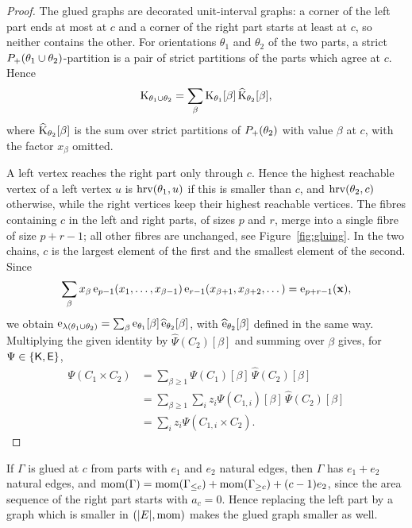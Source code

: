 \begin{proof}
The glued graphs are decorated unit-interval graphs: a corner of the left part
ends at most at $c$ and a corner of the right part starts at least at $c$, so
neither contains the other.
For orientations $\theta_1$ and $\theta_2$ of the two parts, a strict
$P_{+}(\theta_1\cup\theta_2)$-partition is a pair of strict partitions of the
parts which agree at $c$.
Hence
\[
 \mathrm{K}_{\theta_1\cup\theta_2}=\sum_\beta\mathrm{K}_{\theta_1}[\beta]\,
 \widehat{\mathrm{K}}_{\theta_2}[\beta],
\]
where $\widehat{\mathrm{K}}_{\theta_2}[\beta]$ is the sum over strict partitions of
$P_{+}(\theta_2)$ with value $\beta$ at $c$, with the factor $x_\beta$ omitted.

A left vertex reaches the right part only through $c$.
Hence the highest reachable vertex of a left vertex $u$ is
$\operatorname{hrv}(\theta_1,u)$ if this is smaller than $c$, and $\operatorname{hrv}(\theta_2,c)$
otherwise, while the right vertices keep their highest reachable vertices.
The fibres containing $c$ in the left and right parts, of sizes $p$ and $r$,
merge into a single fibre of size $p+r-1$; all other fibres are unchanged, see
Figure~\ref{fig:gluing}.
In the two chains, $c$ is the largest element of the first and the smallest
element of the second.
Since
\[
 \sum_\beta x_\beta\,\mathrm{e}_{p-1}(x_1,\dotsc,x_{\beta-1})\,
 \mathrm{e}_{r-1}(x_{\beta+1},x_{\beta+2},\dotsc)=\mathrm{e}_{p+r-1}(\mathbf{x}),
\]
we obtain $\mathrm{e}_{\lambda(\theta_1\cup\theta_2)}
=\sum_\beta\mathrm{e}_{\theta_1}[\beta]\,\widehat{\mathrm{e}}_{\theta_2}[\beta]$,
with $\widehat{\mathrm{e}}_{\theta_2}[\beta]$ defined in the same way.
Multiplying the given identity by $\widehat\Psi(C_2)[\beta]$ and summing over
$\beta$ gives, for $\Psi\in\{\mathsf{K},\mathsf{E}\}$,
\begin{align*}
 \Psi(C_1\times C_2)
 &=\sum_{\beta\geq1}\Psi(C_1)[\beta]\,\widehat\Psi(C_2)[\beta] \\
 &=\sum_{\beta\geq1}\sum_i
   z_i\Psi(C_{1,i})[\beta]\,\widehat\Psi(C_2)[\beta] \\
 &=\sum_i z_i\Psi(C_{1,i}\times C_2).
\end{align*}
\end{proof}

If $\Gamma$ is glued at $c$ from parts with $e_1$ and $e_2$ natural edges, then
$\Gamma$ has $e_1+e_2$ natural edges, and
$\operatorname{mom}(\Gamma)=\operatorname{mom}(\Gamma_{\leq c})+\operatorname{mom}(\Gamma_{\geq c})+(c-1)e_2$, since the
area sequence of the right part starts with $a_c=0$.
Hence replacing the left part by a graph which is smaller in
$(|E|,\operatorname{mom})$ makes the glued graph smaller as well.

